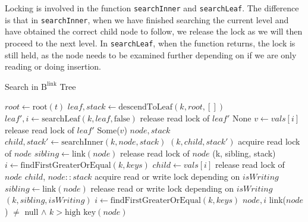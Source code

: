 \documentclass[11pt]{report}
\theoremstyle{definition}
\begin{document}
Locking is involved in the function \texttt{searchInner} and \texttt{searchLeaf}. The difference is that in \texttt{searchInner}, when we have finished searching the current level and have obtained the correct child node to follow, we release the lock as we will then proceed to the next level. In \texttt{searchLeaf}, when the function returns, the lock is still held, as the node needs to be examined further depending on if we are only reading or doing insertion.

\begin{algorithm}[h]
  \caption{Search in $\text{B}^{\text{link}}$ Tree}\label{alg:blink-search}
  \begin{algorithmic}[1] %
    \State $root \gets \text{root}(t)$
    \State $leaf, stack \gets \text{descendToLeaf}(k, root, [])$
    \State $leaf', i \gets \text{searchLeaf}(k, leaf, \text{false})$
    \State release read lock of $leaf'$
    \State \Return None
    \Else
    \State $v \gets vals[i]$
    \State release read lock of $leaf'$
    \State \Return Some($v$)
    \EndIf
    \EndFunction
    \State \Return $node, stack$
    \Else
    \State $child, stack' \gets \text{searchInner}(k, node, stack)$
    \State \Return {}$(k, child, stack')$
    \EndIf
    \EndFunction
    \State acquire read lock of $node$
    \State $sibling \gets \text{link}(node)$
    \State release read lock of $node$
    \State \Return {}(k, sibling, stack)
    \Else
    \State $i \gets \text{findFirstGreaterOrEqual}(k, keys)$
    \State $child \gets vals[i]$
    \State release read lock of $node$
    \State \Return $child$, $node :: stack$
    \EndIf
    \EndFunction
    \State acquire read or write lock depending on $isWriting$
    \State $sibling \gets \text{link}(node)$
    \State release read or write lock depending on $isWriting$
    \State \Return {}$(k, sibling, isWriting)$
    \Else
    \State $i \gets \text{findFirstGreaterOrEqual}(k, keys)$
    \State \Return $node, i$
    \EndIf
    \EndFunction
    \State \Return link($node$) $\neq$ null $\wedge$ $k > \text{high key}(node)$
    \EndFunction
  \end{algorithmic}
\end{algorithm}
\end{document}
